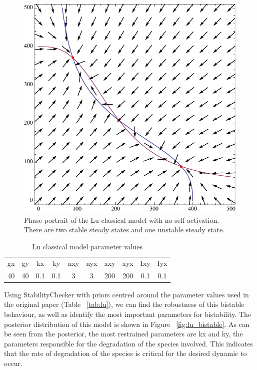 \clearpage
\begin{figure}[p]
\centering
\includegraphics[scale=0.7]{chapterModelling/images/Lu/mae/classic.pdf}
\caption[Phase portrait of the Lu classical model with no self activation]{Phase portrait of the Lu classical model with no self activation. There are two stable steady states and one unstable steady state.}
\label{fig:lu_bis_class}
\end{figure}

\begin{table}[p]
\centering
\caption{Lu classical model parameter values}
\label{tab:lu_cl_bi}
\begin{tabular}{cccccccccc}
gx    & gy    & kx    & ky    & nxy & nyx & xxy     & xyx     & Ixy   & Iyx \\
40&40     &0.1   & 0.1   &  3  &  3  &  200    &  200    & 0.1    &   0.1
\end{tabular}
\end{table}

Using StabilityChecker with priors centred around the parameter values used in the original paper (Table ~\ref{tab:lu}), we can find the robustness of this bistable behaviour, as well as identify the most important parameters for bistability. The posterior distribution of this model is shown in Figure ~\ref{fig:lu_bistable}. As can be seen from the posterior, the most restrained parameters are kx and ky, the parameters responsible for the degradation of the species involved. This indicates that the rate of degradation of the species is critical for the desired dynamic to occur. 

